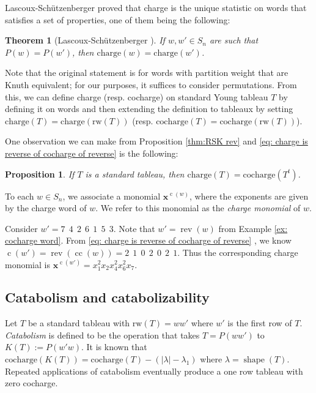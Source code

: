 \documentclass[10pt]{amsart}
\theoremstyle{plain}
\theoremstyle{definition}
\theoremstyle{plain}
\theoremstyle{plain}
\newtheorem{prop}[prop]{Proposition}
\theoremstyle{remark}
\theoremstyle{plain}
\newtheorem{thm}[thm]{Theorem}
\theoremstyle{plain}
\DeclareMathOperator{\shape}{shape}
\DeclareMathOperator{\rev}{rev}
\DeclareMathOperator{\cc}{cc}
\DeclareMathOperator{\cw}{c}
\begin{document}
Lascoux-Sch\"{u}tzenberger \cite{LS1}  proved that charge is the unique statistic on words that satisfies a set of properties, one of them being the following:

\begin{thm}[Lascoux-Sch\"{u}tzenberger \cite{LS1}]
    If $w,w' \in S_n$ are such that $P(w) = P(w')$, then $\text{charge}(w) = \text{charge}(w')$.
\end{thm} 
Note that the original statement is  for words with partition weight that are Knuth equivalent; for our purposes, it suffices to consider permutations.
From this, we can define charge (resp. cocharge) on standard Young tableau $T$ by defining it on words and then extending the definition to tableaux by setting $\text{charge}(T) = \text{charge}(\text{rw}(T))$ (resp. $\text{cocharge}(T) = \text{cocharge}(\text{rw}(T))$).

One observation we can make from Proposition \ref{thm:RSK rev} and \eqref{eq: charge is reverse of cocharge of reverse} is the following:

\begin{prop}\label{thm: charge cocharge trabspose}
    If $T$ is a standard tableau, then
    $\text{charge}(T) = \text{cocharge}(T^t)$.
\end{prop}


To each $w \in S_n$, we associate a monomial $\mathbf{x}^{\cw(w)}$, where the exponents are given by the charge word of $w$. We refer to this monomial as the \textit{charge monomial }of $w$. 
\begin{ex}
Consider $w' = 7 \ \ 4 \ \ 2 \ \ 6\ \ 1 \ \ 5 \ \ 3 .$  Note that $w' = \rev(w)$ from Example \ref{ex: cocharge word}.
From \eqref{eq: charge is reverse of cocharge of reverse} , we know 
$\cw(w') = \rev(\cc(w)) = 2 \ \ 1 \ \ 0 \ \ 2 \ \ 0 \ \ 2 \ \ 1 $. Thus the corresponding charge monomial is $\mathbf{x}^{\cw(w')} = x_1^2 x_2 x_4^2x_6^2x_7.$
\end{ex}


\subsection{Catabolism and catabolizability}\label{section:cat}
Let $T$ be a standard tableau with $\text{rw}(T) = w w'$ where $w'$ is the first row of $T$. \textit{Catabolism} is defined to be the operation that takes $T = P(w w')$ to $K(T) := P(w' w)$. It is known that $\text{cocharge}(K(T)) = \text{cocharge}(T)- (|\lambda| - \lambda_1)$ where $\lambda = \shape(T)$. Repeated applications of catabolism eventually produce a one row tableau with zero cocharge.
\end{document}
